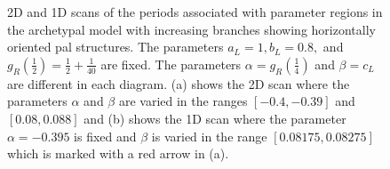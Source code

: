 \begin{figure}
	\centering
	\caption[2D and 1D scans of the periods associated with parameter regions in the archetypal model with increasing branches showing horizontally oriented period-adding-like structures]{
		2D and 1D scans of the periods associated with parameter regions in the archetypal model with increasing branches showing horizontally oriented \gls{pal} structures.
		The parameters $a_L = 1, b_L = 0.8,$ and $g_R\left(\frac{1}{2}\right) = \frac{1}{2} + \frac{1}{40}$ are fixed.
		The parameters $\alpha = g_R\left(\frac{1}{4}\right)$ and $\beta = c_L$ are different in each diagram.
		(a) shows the 2D scan where the parameters $\alpha$ and $\beta$ are varied in the ranges $[-0.4, -0.39]$ and $[0.08, 0.088]$
		and (b) shows the 1D scan where the parameter $\alpha = -0.395$ is fixed and $\beta$ is varied in the range $[0.08175, 0.08275]$ which is marked with a red arrow in (a).
	}
	\label{fig:add.add.like.hor}
\end{figure}

